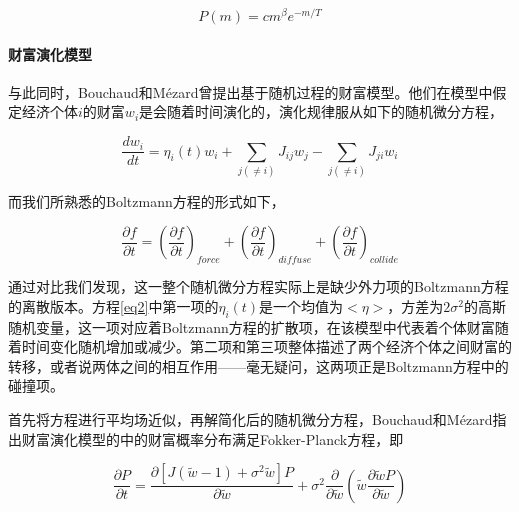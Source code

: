 \documentclass[tsinghuacite]{HustGraduPaper}
\begin{document}
			\begin{equation}
				P(m) = c m^{\beta} e^{- m /T}  \label{eq1}
			\end{equation}
	
			\paragraph{财富演化模型}
			
			与此同时，Bouchaud和Mézard曾提出基于随机过程的财富模型\cite{bouchaud2000wealth}。他们在模型中假定经济个体$i$的财富$w_i$是会随着时间演化的，演化规律服从如下的随机微分方程，
	
			\begin{equation}
				\frac{d w_i}{dt} = \eta_i (t) w_i + \sum_{j (\neq i) } J_{ij} w_j - \sum_{j (\neq i) } J_{ji} w_i \label{eq2}
			\end{equation}
	
			\vspace{2em}
	
			而我们所熟悉的Boltzmann方程的形式如下，
	
			\begin{equation}
				\frac{\partial f}{\partial t} = \left( \frac{\partial f}{\partial t} \right)_{force} + \left( \frac{\partial f}{\partial t} \right)_{diffuse} + \left( \frac{\partial f}{\partial t} \right)_{collide} \label{eq3}
			\end{equation}
	
			\vspace{2em}
	
			通过对比我们发现，这一整个随机微分方程实际上是缺少外力项的Boltzmann方程的离散版本。方程\eqref{eq2}中第一项的$\eta_i (t)$是一个均值为$<\eta>$，方差为$2 \sigma^2$的高斯随机变量，这一项对应着Boltzmann方程的扩散项，在该模型中代表着个体财富随着时间变化随机增加或减少。第二项和第三项整体描述了两个经济个体之间财富的转移，或者说两体之间的相互作用——毫无疑问，这两项正是Boltzmann方程中的碰撞项。
	
			首先将方程进行平均场近似，再解简化后的随机微分方程，Bouchaud和Mézard指出财富演化模型的中的财富概率分布满足Fokker-Planck方程，即
	
			\begin{equation}
				\frac{\partial P}{\partial t} = \frac{\partial [ J(\tilde{w} - 1) + \sigma^2 \tilde{w}  ]P }{\partial \tilde{w} } + \sigma^2 \frac{\partial}{ \partial \tilde{w} } \left( \tilde{w}   \frac{\partial \tilde{w} P}{\partial \tilde{w}}   \right)  \label{eq4}
			\end{equation}
	
\end{document}
